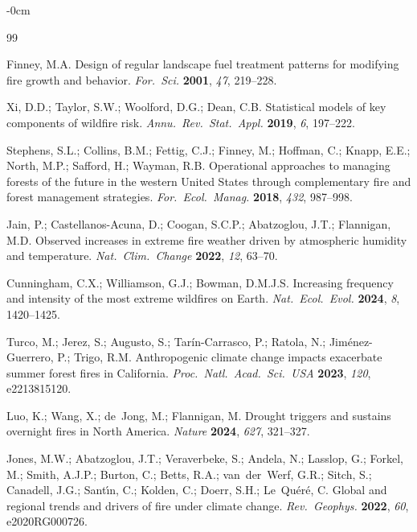 \documentclass[fire,article,submit,pdftex]{../Definitions/mdpi}
\begin{document}
\begin{adjustwidth}{-\extralength}{0cm}

\begin{thebibliography}{99}

Finney, M.A.
Design of regular landscape fuel treatment patterns for modifying fire growth and behavior.
\textit{For.\ Sci.} \textbf{2001}, \textit{47}, 219--228.

Xi, D.D.; Taylor, S.W.; Woolford, D.G.; Dean, C.B.
Statistical models of key components of wildfire risk.
\textit{Annu.\ Rev.\ Stat.\ Appl.} \textbf{2019}, \textit{6}, 197--222.

Stephens, S.L.; Collins, B.M.; Fettig, C.J.; Finney, M.; Hoffman, C.; Knapp, E.E.; North, M.P.; Safford, H.; Wayman, R.B.
Operational approaches to managing forests of the future in the western United States through complementary fire and forest management strategies.
\textit{For.\ Ecol.\ Manag.} \textbf{2018}, \textit{432}, 987--998.

Jain, P.; Castellanos-Acuna, D.; Coogan, S.C.P.; Abatzoglou, J.T.; Flannigan, M.D.
Observed increases in extreme fire weather driven by atmospheric humidity and temperature.
\textit{Nat.\ Clim.\ Change} \textbf{2022}, \textit{12}, 63--70.

Cunningham, C.X.; Williamson, G.J.; Bowman, D.M.J.S.
Increasing frequency and intensity of the most extreme wildfires on Earth.
\textit{Nat.\ Ecol.\ Evol.} \textbf{2024}, \textit{8}, 1420--1425.

Turco, M.; Jerez, S.; Augusto, S.; Tarín-Carrasco, P.; Ratola, N.; Jim\'enez-Guerrero, P.; Trigo, R.M.
Anthropogenic climate change impacts exacerbate summer forest fires in California.
\textit{Proc.\ Natl.\ Acad.\ Sci.\ USA} \textbf{2023}, \textit{120}, e2213815120.

Luo, K.; Wang, X.; de~Jong, M.; Flannigan, M.
Drought triggers and sustains overnight fires in North America.
\textit{Nature} \textbf{2024}, \textit{627}, 321--327.

Jones, M.W.; Abatzoglou, J.T.; Veraverbeke, S.; Andela, N.; Lasslop, G.; Forkel, M.; Smith, A.J.P.; Burton, C.; Betts, R.A.; van~der~Werf, G.R.; Sitch, S.; Canadell, J.G.; Sant\'\i n, C.; Kolden, C.; Doerr, S.H.; Le~Qu\'er\'e, C.
Global and regional trends and drivers of fire under climate change.
\textit{Rev.\ Geophys.} \textbf{2022}, \textit{60}, e2020RG000726.


\end{thebibliography}
\end{adjustwidth}
\end{document}
